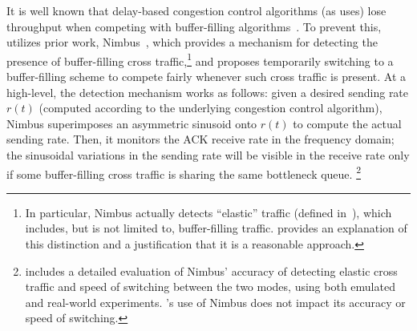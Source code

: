 It is well known that delay-based congestion control algorithms (as \name uses) lose throughput when competing with buffer-filling algorithms~\cite{copa}. 
To prevent this, \name utilizes prior work, Nimbus~\cite{nimbus-arxiv}, which provides a mechanism for detecting the presence of buffer-filling cross traffic,\footnote{In particular, Nimbus actually detects ``elastic'' traffic (defined in~\cite{nimbus-arxiv}), which includes, but is not limited to, buffer-filling traffic. \cite{nimbus-arxiv} provides an explanation of this distinction and a justification that it is a reasonable approach.}
and proposes temporarily switching to a buffer-filling scheme to compete fairly whenever such cross traffic is present.
At a high-level, the detection mechanism works as follows: given a desired sending rate $r(t)$ (computed according to the underlying congestion control algorithm), Nimbus superimposes an asymmetric sinusoid onto $r(t)$ to compute the actual sending rate. Then, it monitors the ACK receive rate in the frequency domain; the sinusoidal variations in the sending rate will be visible in the receive rate only if some buffer-filling cross traffic is sharing the same bottleneck queue.%
\footnote{\cite{nimbus-arxiv} includes a detailed evaluation of Nimbus' accuracy of detecting elastic cross traffic and speed of switching between the two modes, using both emulated and real-world experiments. \name{}'s use of Nimbus does not impact its accuracy or speed of switching.}


